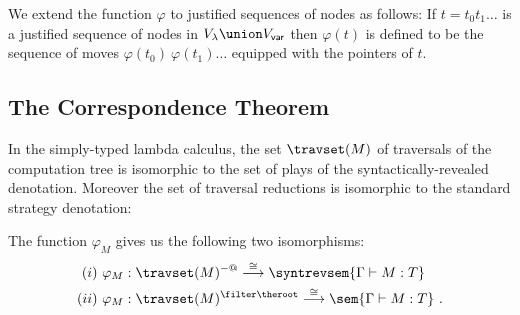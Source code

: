 We extend the function $\varphi$ to justified sequences of nodes as follows: If $t = t_0 t_1 \ldots$ is a justified sequence of nodes in $V_\lambda \union V_{\sf var}$ then $\varphi(t)$ is defined to be the sequence of moves $\varphi(t_0)\ \varphi(t_1) \ldots$ equipped with the pointers of $t$.


\subsection{The Correspondence Theorem}


In the simply-typed lambda calculus, the set $\travset(M)$ of traversals of the computation tree is isomorphic to the set of plays of the syntactically-revealed denotation. Moreover the set of traversal reductions is isomorphic to the standard strategy denotation:

\begin{theorem}
\label{thm:correspondence} The function $\varphi_M$ gives us the following two isomorphisms:
\begin{eqnarray*}
(i)~\varphi_M  &: \travset(M)^{-@} \stackrel{\cong}{\longrightarrow} \syntrevsem{\Gamma \vdash M :T} \\
(ii)~\varphi_M  &: \travset(M )^{\filter \theroot} \stackrel{\cong}{\longrightarrow} \sem{\Gamma \vdash M : T} \ .
\end{eqnarray*}
\end{theorem}


